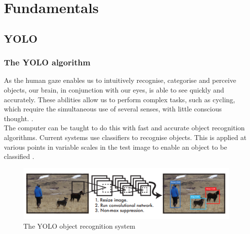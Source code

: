 \chapter{Fundamentals}
\label{ch:fundamentals}


\section{YOLO}

\subsection{The YOLO algorithm \label{subsec:YOLO_Alg}} 
	{As the human gaze enables us to intuitively recognise, categorise and perceive objects, our brain, in conjunction with our eyes, is able to see quickly and accurately. These abilities allow us to perform complex tasks, such as cycling, which require the simultaneous use of several senses, with little conscious thought. \citep{Redmon2016}. \\
	The computer can be taught to do this with fast and accurate object recognition algorithms. Current systems use classifiers to recognise objects. This is applied at various points in variable scales in the test image to enable an object to be classified \citep{Redmon2016}. \\ 
	
	\begin{figure}[ht]
		\centering
		\includegraphics*[scale = 1, keepaspectratio, trim=2 2 2 2 ]{images/YOLO/YOLO_detection_system.png}
		\caption[The YOLO object recognition system]{The YOLO object recognition system \citep{Redmon2016}}
		\label{YOLO_Objectdetection}
 	\end{figure}
	
}
